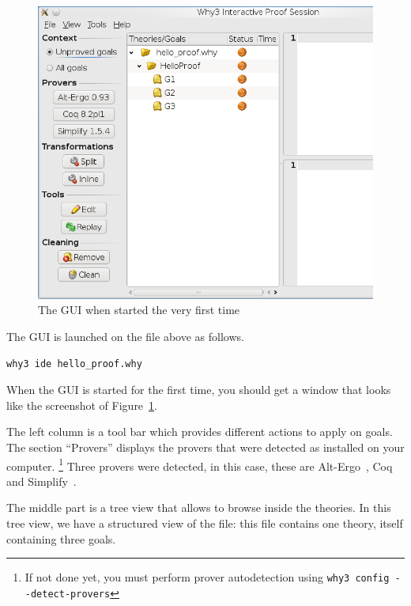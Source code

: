 \begin{figure}[tbp]
  \includegraphics[width=\textwidth]{gui-0-70-1.png}
  \caption{The GUI when started the very first time}
  \label{fig:gui1}
\end{figure}

The GUI is launched on the file above as follows.
\begin{verbatim}
why3 ide hello_proof.why
\end{verbatim}
When the GUI is started for the first time, you should get a window
that looks like the screenshot of Figure~\ref{fig:gui1}.

The left column is a tool bar which provides different actions to
apply on goals. The section ``Provers'' displays the provers that were
detected as installed on your computer.%
\footnote{If not done yet, you
  must perform prover autodetection using \texttt{why3 config
    -{}-detect-provers}}
Three provers were detected, in this case,
these are Alt-Ergo~\cite{ergo}, Coq~\cite{CoqArt} and
Simplify~\cite{simplify05}.

The middle part is a tree view that
allows to browse inside the theories.
In this tree view, we have a structured view of the file: this file
contains one theory, itself containing three goals.


